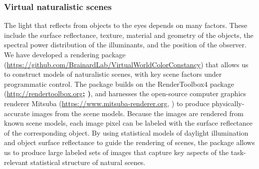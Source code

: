 \documentclass{jov}
\providecommand{\DIFaddtex}[1]{{\bf #1}} %
\providecommand{\DIFdeltex}[1]{} %
\providecommand{\DIFaddbegin}{} %
\providecommand{\DIFaddend}{} %
\providecommand{\DIFdelbegin}{} %
\providecommand{\DIFdelend}{} %
\providecommand{\DIFadd}[1]{\texorpdfstring{\DIFaddtex{#1}}{#1}} %
\providecommand{\DIFdel}[1]{\texorpdfstring{\DIFdeltex{#1}}{}} %
\newcommand{\DIFscaledelfig}{0.5}
\newlength{\DIFdelgraphicswidth} %
\newlength{\DIFdelgraphicsheight} %
\newcommand{\DIFaddincludegraphics}[2][]{{\color{blue}\fbox{\DIFOincludegraphics[#1]{#2}}}} %
\newcommand{\DIFdelincludegraphics}[2][]{%
\sbox{\DIFdelgraphicsbox}{\DIFOincludegraphics[#1]{#2}}%
\settoboxwidth{\DIFdelgraphicswidth}{\DIFdelgraphicsbox} %
\settoboxtotalheight{\DIFdelgraphicsheight}{\DIFdelgraphicsbox} %
\scalebox{\DIFscaledelfig}{%
\parbox[b]{\DIFdelgraphicswidth}{\usebox{\DIFdelgraphicsbox}\\[-\baselineskip] \rule{\DIFdelgraphicswidth}{0em}}\llap{\resizebox{\DIFdelgraphicswidth}{\DIFdelgraphicsheight}{%
\setlength{\unitlength}{\DIFdelgraphicswidth}%
\begin{picture}(1,1)%
\thicklines\linethickness{2pt} %
{\color[rgb]{1,0,0}\put(0,0){\framebox(1,1){}}}%
{\color[rgb]{1,0,0}\put(0,0){\line( 1,1){1}}}%
{\color[rgb]{1,0,0}\put(0,1){\line(1,-1){1}}}%
\end{picture}%
}\hspace*{3pt}}} %
} %
\DeclareRobustCommand{\DIFaddbegin}{\DIFOaddbegin \let\includegraphics\DIFaddincludegraphics} %
\DeclareRobustCommand{\DIFaddend}{\DIFOaddend \let\includegraphics\DIFOincludegraphics} %
\DeclareRobustCommand{\DIFdelbegin}{\DIFOdelbegin \let\includegraphics\DIFdelincludegraphics} %
\DeclareRobustCommand{\DIFdelend}{\DIFOaddend \let\includegraphics\DIFOincludegraphics} %
\begin{document}
\subsubsection{Virtual naturalistic scenes}
The light that reflects from objects to the eyes depends on many factors.
These include the surface reflectance, texture, material and geometry of the objects, 
the spectral power distribution of the illuminants, and the position of the observer.
We have developed a rendering package 
(\href{https://github.com/BrainardLab/VirtualWorldColorConstancy}{https://github.com/BrainardLab/VirtualWorldColorConstancy}) 
that allows us to construct models of naturalistic scenes, with key scene factors under programmatic control.
The package builds on the RenderToolbox4 package (\href{http://rendertoolbox.org}{http://rendertoolbox.org}\DIFdelbegin \DIFdel{) \cite{heasly2014rendertoolbox3}}\DIFdelend \DIFaddbegin \DIFadd{; )}\DIFaddend ,
and harnesses the open-source computer graphics renderer Mitsuba (\href{https://www.mitsuba-renderer.org}{https://www.mitsuba-renderer.org}, 
) to produce physically-accurate images from the scene models.
Because the images are rendered from known scene models, each image pixel can be labeled with 
the surface reflectance of the corresponding object.
By using statistical models of daylight illumination and object surface reflectance to guide the rendering of scenes, 
the package allows us to produce large labeled sets of images that capture key aspects of the task-relevant 
statistical structure of natural scenes.
\end{document}
